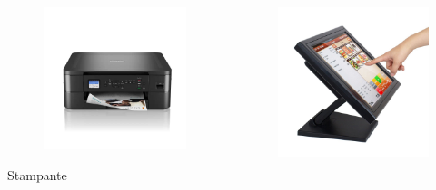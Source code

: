 \documentclass[handout]{beamer}
\begin{document}
\begin{frame}
\begin{columns}
\begin{column}{.22\textwidth}
\begin{center}
\begin{figure}
      \includegraphics[width=\columnwidth]{img/stampante.jpg}
    \end{figure}
    Stampante
    \end{center}
\end{column}
\begin{column}{.22\textwidth}
  \begin{center} 
    \begin{figure}
      \includegraphics[width=\columnwidth]{img/touchscreen.jpg}

\end{figure}
\end{center}
\end{column}
\end{columns}
\end{frame}
\end{document}

